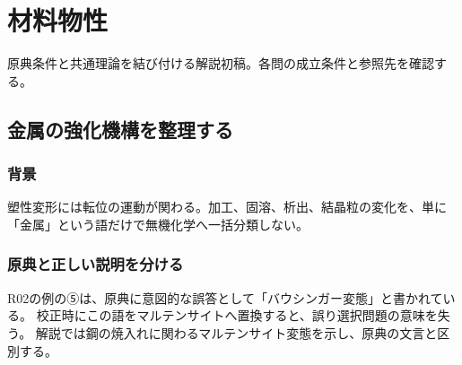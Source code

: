 \chapter{材料物性}
\noindent 原典条件と共通理論を結び付ける解説初稿。各問の成立条件と参照先を確認する。
\section{金属の強化機構を整理する}
\subsection{背景}
塑性変形には転位の運動が関わる。加工、固溶、析出、結晶粒の変化を、単に「金属」という語だけで無機化学へ一括分類しない。
\subsection{原典と正しい説明を分ける}
R02の例の⑤は、原典に意図的な誤答として「バウシンガー変態」と書かれている。
校正時にこの語をマルテンサイトへ置換すると、誤り選択問題の意味を失う。
解説では鋼の焼入れに関わるマルテンサイト変態を示し\cite{martensite_cambridge}、原典の文言と区別する。



